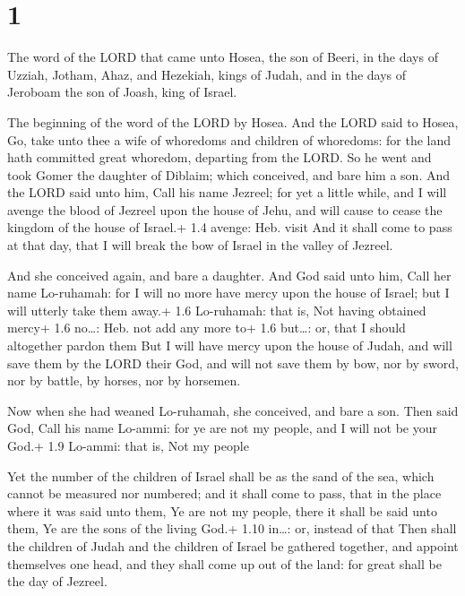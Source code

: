 \hypertarget{section}{%
\section{1}\label{section}}

 The word of the LORD that came unto Hosea, the son of
Beeri, in the days of Uzziah, Jotham, Ahaz, and Hezekiah, kings of
Judah, and in the days of Jeroboam the son of Joash, king of Israel.

 The beginning of the word of the LORD by Hosea. And the
LORD said to Hosea, Go, take unto thee a wife of whoredoms and children
of whoredoms: for the land hath committed great whoredom, departing from
the LORD.  So he went and took Gomer the daughter of
Diblaim; which conceived, and bare him a son.  And the LORD
said unto him, Call his name Jezreel; for yet a little while, and I will
avenge the blood of Jezreel upon the house of Jehu, and will cause to
cease the kingdom of the house of Israel.+ 1.4 avenge: Heb. visit
 And it shall come to pass at that day, that I will break
the bow of Israel in the valley of Jezreel.

 And she conceived again, and bare a daughter. And God
said unto him, Call her name Lo-ruhamah: for I will no more have mercy
upon the house of Israel; but I will utterly take them away.+ 1.6
Lo-ruhamah: that is, Not having obtained mercy+ 1.6 no\ldots: Heb. not
add any more to+ 1.6 but\ldots: or, that I should altogether pardon them
 But I will have mercy upon the house of Judah, and will
save them by the LORD their God, and will not save them by bow, nor by
sword, nor by battle, by horses, nor by horsemen.

 Now when she had weaned Lo-ruhamah, she conceived, and
bare a son.  Then said God, Call his name Lo-ammi: for ye
are not my people, and I will not be your God.+ 1.9 Lo-ammi: that is,
Not my people

 Yet the number of the children of Israel shall be as the
sand of the sea, which cannot be measured nor numbered; and it shall
come to pass, that in the place where it was said unto them, Ye are not
my people, there it shall be said unto them, Ye are the sons of the
living God.+ 1.10 in\ldots: or, instead of that  Then shall
the children of Judah and the children of Israel be gathered together,
and appoint themselves one head, and they shall come up out of the land:
for great shall be the day of Jezreel.


